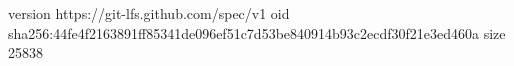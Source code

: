 version https://git-lfs.github.com/spec/v1
oid sha256:44fe4f2163891ff85341de096ef51c7d53be840914b93c2ecdf30f21e3ed460a
size 25838
